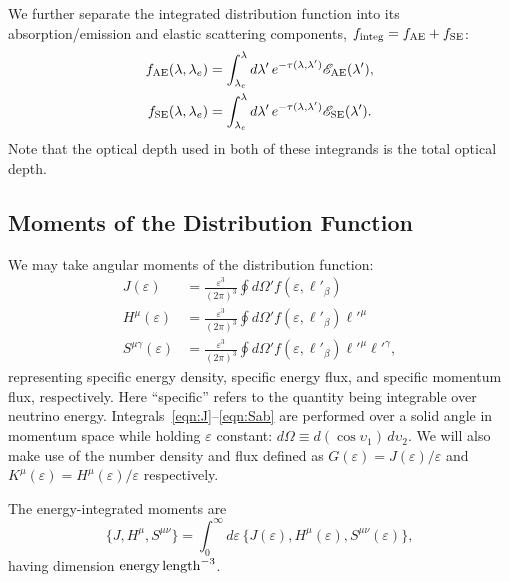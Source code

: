 \documentclass[aps,floatfix,prd,superscriptaddress,twocolumn]{revtex4-1}
\newcommand{\todo}[1]{\marginpar{\tiny{\textcolor{red}{#1}}}}
\begin{document}
We further separate the integrated distribution function into
its absorption/emission and elastic scattering components,
$f_{\rm integ} = f_{\rm AE} + f_{\rm SE}$:
\begin{align}
  \label{eqn:rendering_fae}
  f_{\rm AE}(\lambda,\lambda_e)
  &= \int_{\lambda_e}^\lambda d\lambda'\,e^{-\tau(\lambda,\lambda')}
  \mathscr{E_{\rm AE}}(\lambda'), \\
  \label{eqn:rendering_fse}
  f_{\rm SE}(\lambda,\lambda_e)
  &= \int_{\lambda_e}^\lambda d\lambda'\,e^{-\tau(\lambda,\lambda')}
  \mathscr{E_{\rm SE}}(\lambda').
\end{align}
Note that the optical depth used in both of these integrands is the total
optical depth.

\subsection{Moments of the Distribution Function}
\label{ssec:moments}
\todo{code these up}
We may take angular moments of the distribution function:
\begin{align}
  \label{eqn:J}
  J(\varepsilon) &=
  \frac{\varepsilon^3}{(2\pi)^3} \oint d\Omega' f(\varepsilon, \ell'_\beta) \\
  \label{eqn:Ha}
  H^\mu(\varepsilon) &=
  \frac{\varepsilon^3}{(2\pi)^3} \oint d\Omega' f(\varepsilon, \ell'_\beta) \ell'^\mu \\
  \label{eqn:Sab}
  S^{\mu\gamma}(\varepsilon) &=
  \frac{\varepsilon^3}{(2\pi)^3} \oint d\Omega' f(\varepsilon, \ell'_\beta) \ell'^\mu \ell'^\gamma,
\end{align}
representing specific energy density, specific energy flux, and
specific momentum flux, respectively.
Here ``specific'' refers to the quantity being integrable over neutrino energy.
\todo{relate moments to other frames?}
Integrals~\ref{eqn:J}--\ref{eqn:Sab} are performed over a solid angle in
momentum space while holding $\varepsilon$ constant:
$d\Omega \equiv d(\cos\upsilon_1)\,d\upsilon_2$.
\todo{consistent with Eqn.~\ref{eqn:def_direction}?}
We will also make use of the number density and flux defined as
$G(\varepsilon)=J(\varepsilon)/\varepsilon$
and $K^\mu(\varepsilon)=H^\mu(\varepsilon)/\varepsilon$
respectively.

The energy-integrated moments are
\begin{equation}
  \label{eqn:J_H_S_eps_integrated}
  \big\{ J,H^\mu,S^{\mu\nu} \big\} = \int_0^\infty d\varepsilon \,
  \big\{ J(\varepsilon),H^\mu(\varepsilon),S^{\mu\nu}(\varepsilon) \big\},
\end{equation}
having dimension ${\rm energy}\,{\rm length}^{-3}$.
\end{document}
